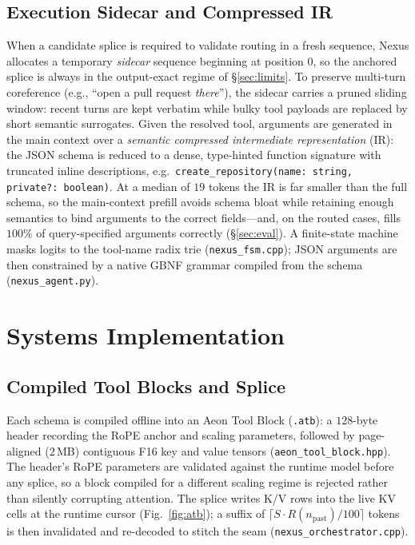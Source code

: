 \documentclass[10pt,conference]{IEEEtran}
\newcommand{\code}[1]{\texttt{\small #1}}
\begin{document}
\subsection{Execution Sidecar and Compressed IR}
When a candidate splice is required to validate routing in a fresh sequence, Nexus allocates a
temporary \emph{sidecar} sequence beginning at position $0$, so the anchored splice is always in
the output-exact regime of \S\ref{sec:limits}. To preserve multi-turn coreference (e.g., ``open a
pull request \emph{there}''), the sidecar carries a pruned sliding window: recent turns are kept
verbatim while bulky tool payloads are replaced by short semantic surrogates. Given the resolved
tool, arguments are generated in the main context over a \emph{semantic compressed intermediate
representation} (IR): the JSON
schema is reduced to a dense, type-hinted function signature with truncated inline descriptions,
e.g.\ \code{create\_repository(name: string, private?: boolean)}. At a median of $19$ tokens the IR
is far smaller than the full schema, so the main-context prefill avoids schema bloat while
retaining enough semantics to bind arguments to the correct fields---and, on the routed cases,
fills $100\%$ of query-specified arguments correctly (\S\ref{sec:eval}). A finite-state machine
masks logits to the tool-name radix trie (\code{nexus\_fsm.cpp}); JSON arguments are then constrained
by a native GBNF grammar compiled from the schema (\code{nexus\_agent.py}).

\section{Systems Implementation}
\label{sec:systems}
\subsection{Compiled Tool Blocks and Splice}
Each schema is compiled offline into an Aeon Tool Block (\code{.atb}): a $128$-byte header
recording the RoPE anchor and scaling parameters, followed by page-aligned ($2$\,MB) contiguous
F16 key and value tensors (\code{aeon\_tool\_block.hpp}). The header's RoPE parameters are validated
against the runtime model before any splice, so a block compiled for a different scaling regime is
rejected rather than silently corrupting attention. The splice writes K/V rows into the live KV
cells at the runtime cursor (Fig.~\ref{fig:atb}); a suffix of $\lceil S\cdot
R(n_{\mathrm{past}})/100\rceil$ tokens is then invalidated and re-decoded to stitch the seam
(\code{nexus\_orchestrator.cpp}).
\end{document}

